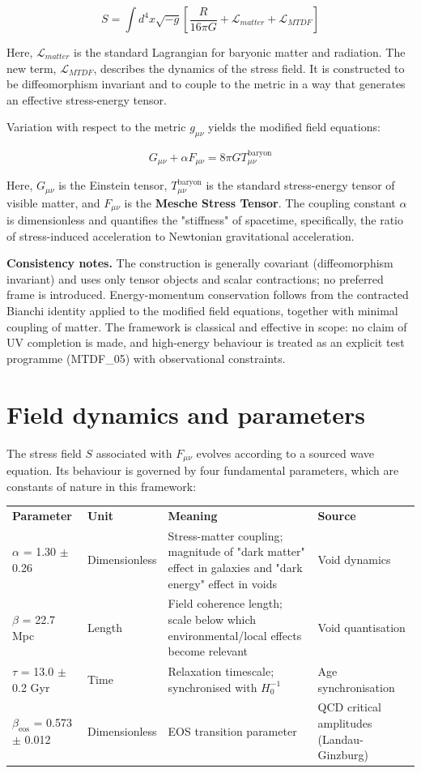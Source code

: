 \documentclass[11pt,a4paper]{article}
\begin{document}
$$ S = \int d^4x \sqrt{-g} \left[ \frac{R}{16\pi G} + \mathcal{L}_{matter} + \mathcal{L}_{MTDF} \right] $$

Here, $\mathcal{L}_{matter}$ is the standard Lagrangian for baryonic matter and radiation. The new term, $\mathcal{L}_{MTDF}$, describes the dynamics of the stress field. It is constructed to be diffeomorphism invariant and to couple to the metric in a way that generates an effective stress-energy tensor.

Variation with respect to the metric $g_{\mu\nu}$ yields the modified field equations:

$$ G_{\mu\nu} + \alpha F_{\mu\nu} = 8\pi G T_{\mu\nu}^{\text{baryon}} $$

Here, $G_{\mu\nu}$ is the Einstein tensor, $T_{\mu\nu}^{\text{baryon}}$ is the standard stress-energy tensor of visible matter, and $F_{\mu\nu}$ is the \textbf{Mesche Stress Tensor}. The coupling constant $\alpha$ is dimensionless and quantifies the "stiffness" of spacetime, specifically, the ratio of stress-induced acceleration to Newtonian gravitational acceleration.

\textbf{Consistency notes.} The construction is generally covariant (diffeomorphism invariant) and uses only tensor objects and scalar contractions; no preferred frame is introduced. Energy-momentum conservation follows from the contracted Bianchi identity applied to the modified field equations, together with minimal coupling of matter. The framework is classical and effective in scope: no claim of UV completion is made, and high-energy behaviour is treated as an explicit test programme (MTDF\_\allowbreak{}05) with observational constraints.

\section{Field dynamics and parameters}
\label{sec:sec4}
The stress field $S$ associated with $F_{\mu\nu}$ evolves according to a sourced wave equation. Its behaviour is governed by four fundamental parameters, which are constants of nature in this framework:

\begin{table}[H]
\centering
\footnotesize
\begin{tabularx}{\linewidth}{l>{\RaggedRight\arraybackslash}X>{\RaggedRight\arraybackslash}X>{\RaggedRight\arraybackslash}X}
\toprule
\textbf{Parameter} & \textbf{Unit} & \textbf{Meaning} & \textbf{Source} \tabularnewline
$\alpha$ = 1.30 $\pm$ 0.26 & Dimensionless & Stress-matter coupling; magnitude of "dark matter" effect in galaxies and "dark energy" effect in voids & Void dynamics \tabularnewline
$\beta$ = 22.7 Mpc & Length & Field coherence length; scale below which environmental/\allowbreak{}local effects become relevant & Void quantisation \tabularnewline
$\tau$ = 13.0 $\pm$ 0.2 Gyr & Time & Relaxation timescale; synchronised with $H_0^{-1}$ & Age synchronisation \tabularnewline
$\beta_\text{eos}$ = 0.573 $\pm$ 0.012 & Dimensionless & EOS transition parameter & QCD critical amplitudes (Landau-Ginzburg) \tabularnewline
\bottomrule
\end{tabularx}
\end{table}
\end{document}
